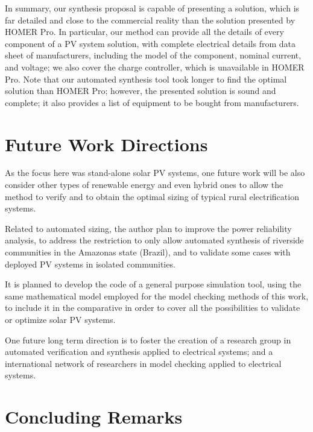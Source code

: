In summary, our synthesis proposal is capable of presenting a solution, which is far detailed and close to the commercial reality than the solution presented by HOMER Pro. In particular, our method can provide all the details of every component of a PV system solution, with complete electrical details from data sheet of manufacturers, including the model of the component, nominal current, and voltage; we also cover the charge controller, which is unavailable in HOMER Pro. Note that our automated synthesis tool took longer to find the optimal solution than HOMER Pro; however, the presented solution is sound and complete; it also provides a list of equipment to be bought from manufacturers. %


\section{Future Work Directions}

As the focus here was stand-alone solar PV systems, one future work will be also consider other types of renewable energy and even hybrid ones to allow the method to verify and to obtain the optimal sizing of typical rural electrification systems.

Related to automated sizing, the author plan to improve the power reliability analysis, 
to address the restriction to only allow automated synthesis of riverside communities in the Amazonas state (Brazil), and to validate some cases with deployed PV systems in isolated communities.

It is planned to develop the code of a general purpose simulation tool, using the same mathematical model employed for the model checking methods of this work, to include it in the comparative in order to cover all the possibilities to validate or optimize solar PV systems.

One future long term direction is to foster the creation of a research group in automated verification and synthesis applied to electrical systems; and a international network of researchers in model checking applied to electrical systems.


\section{Concluding Remarks}

